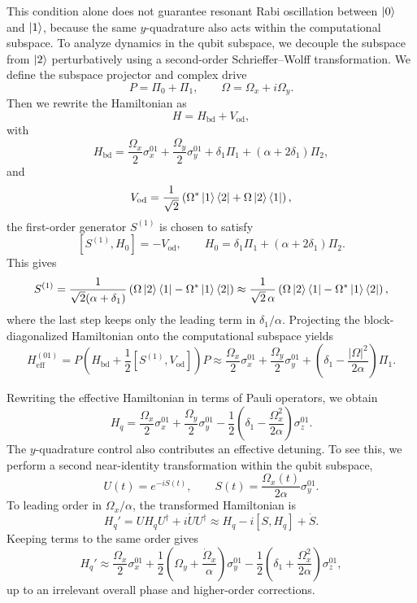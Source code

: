 This condition alone does not guarantee resonant Rabi oscillation between \(\ket{0}\) and \(\ket{1}\), because the same \(y\)-quadrature also acts within the computational subspace. To analyze dynamics in the qubit subspace, we decouple the subspace from \(\ket{2}\) perturbatively using a second-order Schrieffer--Wolff transformation. We define the subspace projector and complex drive
\[
P=\Pi_0+\Pi_1,
\qquad
\Omega=\Omega_x+i\Omega_y.
\]
Then we rewrite the Hamiltonian as
\[
H=H_{\mathrm{bd}}+V_{\mathrm{od}},
\]
with
\[
H_{\mathrm{bd}}
=
\frac{\Omega_x}{2}\sigma_x^{01}
+
\frac{\Omega_y}{2}\sigma_y^{01}
+
\delta_1\Pi_1
+
(\alpha+2\delta_1)\Pi_2,
\]
and
\[
V_{\mathrm{od}}
=
\frac{1}{\sqrt{2}}
\left(
\Omega^* \ket{1}\bra{2}
+
\Omega \ket{2}\bra{1}
\right),
\]
the first-order generator \(S^{(1)}\) is chosen to satisfy
\[
[S^{(1)},H_0]=-V_{\mathrm{od}},
\qquad
H_0=\delta_1\Pi_1+(\alpha+2\delta_1)\Pi_2.
\]
This gives
\[
S^{(1)}
=
\frac{1}{\sqrt{2}(\alpha+\delta_1)}
\left(
\Omega \ket{2}\bra{1}
-
\Omega^* \ket{1}\bra{2}
\right)
\approx
\frac{1}{\sqrt{2}\,\alpha}
\left(
\Omega \ket{2}\bra{1}
-
\Omega^* \ket{1}\bra{2}
\right),
\]
where the last step keeps only the leading term in \(\delta_1/\alpha\). Projecting the block-diagonalized Hamiltonian onto the computational subspace yields
\[
H_{\mathrm{eff}}^{(01)}
=
P\left(H_{\mathrm{bd}}+\frac12[S^{(1)},V_{\mathrm{od}}]\right)P
\approx
\frac{\Omega_x}{2}\sigma_x^{01}
+
\frac{\Omega_y}{2}\sigma_y^{01}
+
\left(
\delta_1-\frac{|\Omega|^2}{2\alpha}
\right)\Pi_1.
\]

Rewriting the effective Hamiltonian in terms of Pauli operators, we obtain
\begin{equation}
\label{eq:Hq_drag}
H_q
=
\frac{\Omega_x}{2}\sigma_x^{01}
+
\frac{\Omega_y}{2}\sigma_y^{01}
-
\frac{1}{2}
\left(
\delta_1-\frac{\Omega_x^2}{2\alpha}
\right)\sigma_z^{01}.
\end{equation}
The \(y\)-quadrature control also contributes an effective detuning. To see this, we perform a second near-identity transformation within the qubit subspace,
\begin{equation}
\label{eq:Uq_drag}
U(t)=e^{-iS(t)},
\qquad
S(t)=\frac{\Omega_x(t)}{2\alpha}\sigma_y^{01}.
\end{equation}
To leading order in \(\Omega_x/\alpha\), the transformed Hamiltonian is
\begin{equation}
\label{eq:Hqprime_expand_drag}
H_q'
=
U H_q U^\dagger + i \dot U U^\dagger
\approx
H_q-i[S,H_q]+\dot S.
\end{equation}
Keeping terms to the same order gives
\begin{equation}
\label{eq:Hqprime_drag}
H_q'
\approx
\frac{\Omega_x}{2}\sigma_x^{01}
+
\frac{1}{2}\left(\Omega_y+\frac{\dot\Omega_x}{\alpha}\right)\sigma_y^{01}
-
\frac{1}{2}
\left(
\delta_1+\frac{\Omega_x^2}{2\alpha}
\right)\sigma_z^{01},
\end{equation}
up to an irrelevant overall phase and higher-order corrections.

